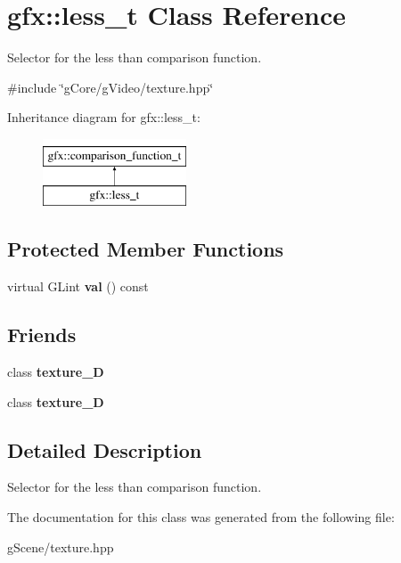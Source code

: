 \hypertarget{classgfx_1_1less__t}{\section{gfx\-:\-:less\-\_\-t Class Reference}
\label{classgfx_1_1less__t}
}


Selector for the less than comparison function.  




{\ttfamily \#include \char`\"{}g\-Core/g\-Video/texture.\-hpp\char`\"{}}

Inheritance diagram for gfx\-:\-:less\-\_\-t\-:\begin{figure}[H]
\begin{center}
\leavevmode
\includegraphics[height=2.000000cm]{classgfx_1_1less__t}
\end{center}
\end{figure}
\subsection*{Protected Member Functions}
\begin{DoxyCompactItemize}
\item 
\hypertarget{classgfx_1_1less__t_ade715f9339c3c788bfb79169abb4d83d}{virtual G\-Lint {\bfseries val} () const }\label{classgfx_1_1less__t_ade715f9339c3c788bfb79169abb4d83d}

\end{DoxyCompactItemize}
\subsection*{Friends}
\begin{DoxyCompactItemize}
\item 
\hypertarget{classgfx_1_1less__t_a2039d67f6166ccf823c78e3476aad9aa}{class {\bfseries texture\-\_\-D}}\label{classgfx_1_1less__t_a2039d67f6166ccf823c78e3476aad9aa}

\item 
\hypertarget{classgfx_1_1less__t_a22ad86ef46c3b17357a0cd59e50bc7dd}{class {\bfseries texture\-\_\-D}}\label{classgfx_1_1less__t_a22ad86ef46c3b17357a0cd59e50bc7dd}

\end{DoxyCompactItemize}


\subsection{Detailed Description}
Selector for the less than comparison function. 

The documentation for this class was generated from the following file\-:\begin{DoxyCompactItemize}
\item 
g\-Scene/texture.\-hpp\end{DoxyCompactItemize}
